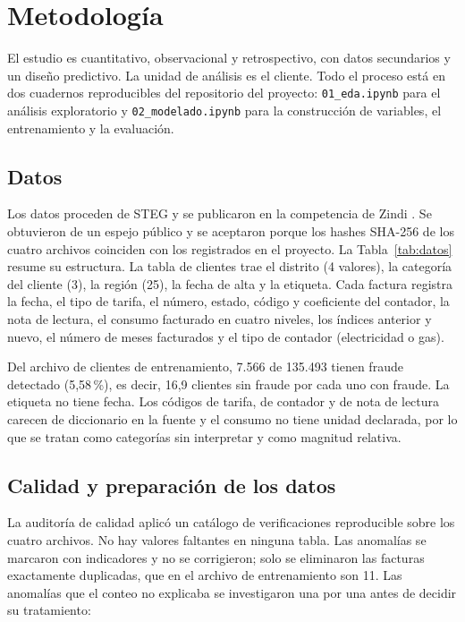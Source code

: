 \section{Metodología}\label{sec:metodologia}

El estudio es cuantitativo, observacional y retrospectivo, con datos secundarios y un diseño
predictivo. La unidad de análisis es el cliente. Todo el proceso está en dos cuadernos
reproducibles del repositorio del proyecto: \texttt{01\_eda.ipynb} para el análisis
exploratorio y \texttt{02\_modelado.ipynb} para la construcción de variables, el
entrenamiento y la evaluación.

\subsection{Datos}

Los datos proceden de STEG y se publicaron en la competencia de Zindi
\parencite{zindi2019}. Se obtuvieron de un espejo público \parencite{kaggle_steg} y se
aceptaron porque los hashes SHA-256 de los cuatro archivos coinciden con los registrados
en el proyecto. La Tabla~\ref{tab:datos} resume su estructura. La tabla de clientes trae el
distrito (4 valores), la categoría del cliente (3), la región (25), la fecha de alta y la
etiqueta. Cada factura registra la fecha, el tipo de tarifa, el número, estado, código y
coeficiente del contador, la nota de lectura, el consumo facturado en cuatro niveles, los
índices anterior y nuevo, el número de meses facturados y el tipo de contador (electricidad
o gas).



Del archivo de clientes de entrenamiento, 7.566 de 135.493 tienen fraude detectado
(5,58\,\%), es decir, 16,9 clientes sin fraude por cada uno con fraude. La etiqueta no tiene
fecha. Los códigos de tarifa, de contador y de nota de lectura carecen de diccionario en la
fuente y el consumo no tiene unidad declarada, por lo que se tratan como categorías sin
interpretar y como magnitud relativa.

\subsection{Calidad y preparación de los datos}

La auditoría de calidad aplicó un catálogo de verificaciones reproducible sobre los cuatro
archivos. No hay valores faltantes en ninguna tabla. Las anomalías se marcaron con
indicadores y no se corrigieron; solo se eliminaron las facturas exactamente duplicadas,
que en el archivo de entrenamiento son 11.
Las anomalías que el conteo no explicaba se investigaron una por una antes de decidir su
tratamiento:

